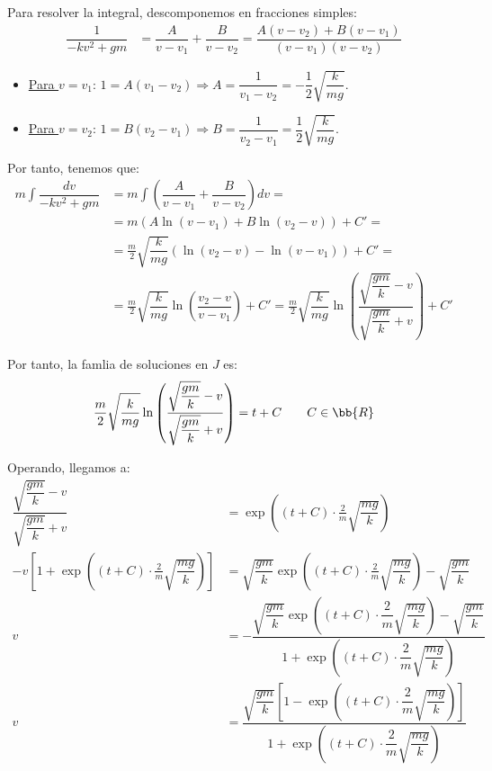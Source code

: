\begin{ejercicio}
    Para resolver la integral, descomponemos en fracciones simples:
    \begin{align*}
        \dfrac{1}{-kv^2 + gm} &= \dfrac{A}{v-v_1} + \dfrac{B}{v-v_2} = \dfrac{A(v-v_2) + B(v-v_1)}{(v-v_1)(v-v_2)}
    \end{align*}
    \begin{itemize}
        \item \ul{Para $v=v_1$}: $1=A(v_1-v_2) \Longrightarrow A=\dfrac{1}{v_1-v_2}=-\dfrac{1}{2}\sqrt{\dfrac{k}{mg}}$.
        \item \ul{Para $v=v_2$}: $1=B(v_2-v_1) \Longrightarrow B=\dfrac{1}{v_2-v_1}=\dfrac{1}{2}\sqrt{\dfrac{k}{mg}}$.
    \end{itemize}

    Por tanto, tenemos que:
    \begin{align*}
        m\int \dfrac{dv}{-kv^2 + gm} &= m\int \left(\dfrac{A}{v-v_1} + \dfrac{B}{v-v_2}\right)dv
        =\\&=m\left(A\ln(v-v_1) + B\ln(v_2-v)\right) + C'
        =\\&= \frac{m}{2}\sqrt{\dfrac{k}{mg}}\left(\ln(v_2-v) - \ln(v-v_1)\right) + C'
        =\\&= \frac{m}{2}\sqrt{\dfrac{k}{mg}}\ln\left(\dfrac{v_2-v}{v-v_1}\right) + C'
        = \frac{m}{2}\sqrt{\dfrac{k}{mg}}\ln\left(\dfrac{\sqrt{\dfrac{gm}{k}}-v}{\sqrt{\dfrac{gm}{k}}+v}\right) + C'
    \end{align*}

    Por tanto, la famlia de soluciones en $J$ es:
    \begin{equation*}
        \dfrac{m}{2}\sqrt{\dfrac{k}{mg}}\ln\left(\dfrac{\sqrt{\dfrac{gm}{k}}-v}{\sqrt{\dfrac{gm}{k}}+v}\right) = t + C \qquad C\in \bb{R}
    \end{equation*}

    Operando, llegamos a:
    \begin{align*}
        \dfrac{\sqrt{\dfrac{gm}{k}}-v}{\sqrt{\dfrac{gm}{k}}+v} &= \exp\left((t+C)\cdot \frac{2}{m}\sqrt{\dfrac{mg}{k}}\right)\\
        -v\left[1+\exp\left((t+C)\cdot \frac{2}{m}\sqrt{\dfrac{mg}{k}}\right)\right] &= \sqrt{\dfrac{gm}{k}}\exp\left((t+C)\cdot \frac{2}{m}\sqrt{\dfrac{mg}{k}}\right) - \sqrt{\dfrac{gm}{k}}\\
        v&=-\dfrac{\sqrt{\dfrac{gm}{k}}\exp\left((t+C)\cdot \dfrac{2}{m}\sqrt{\dfrac{mg}{k}}\right) - \sqrt{\dfrac{gm}{k}}}{1+\exp\left((t+C)\cdot \dfrac{2}{m}\sqrt{\dfrac{mg}{k}}\right)} \\
        v&=\dfrac{\sqrt{\dfrac{gm}{k}}\left[1-\exp\left((t+C)\cdot \dfrac{2}{m}\sqrt{\dfrac{mg}{k}}\right)\right]}{1+\exp\left((t+C)\cdot \dfrac{2}{m}\sqrt{\dfrac{mg}{k}}\right)}
    \end{align*}


\end{ejercicio}
